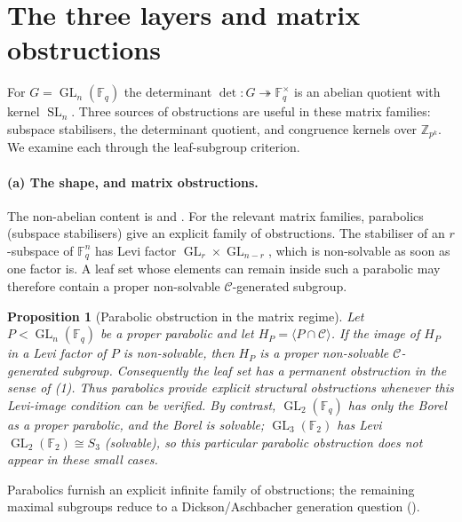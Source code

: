 \documentclass[11pt]{amsart}
\newtheorem{proposition}[proposition]{Proposition}
\theoremstyle{definition}
\theoremstyle{remark}
\theoremstyle{plain}
\theoremstyle{plain}
\numberwithin{equation}{section}
\DeclareMathOperator{\GL}{GL}
\DeclareMathOperator{\SL}{SL}
\newcommand{\F}{\mathbb{F}}
\newcommand{\Z}{\mathbb{Z}}
\begin{document}
\newpage
\section{The three layers and matrix obstructions}
\label{sec:layers}

For $G=\GL_n(\F_q)$ the determinant $\det:G\twoheadrightarrow\F_q^\times$
is an abelian quotient with kernel $\SL_n$. Three sources of obstructions
are useful in these matrix families: subspace stabilisers, the determinant
quotient, and congruence kernels over $\Z_{p^k}$. We examine each through
the leaf-subgroup criterion.

\paragraph{(a) The shape, and matrix obstructions.}
The non-abelian content is  and . For the relevant
matrix families, parabolics (subspace stabilisers) give an explicit family of
obstructions. The stabiliser of an $r$-subspace of $\F_q^n$ has Levi
factor $\GL_r\times\GL_{n-r}$, which is non-solvable as soon as one factor is. A leaf set whose
elements can remain inside such a parabolic may therefore contain a proper non-solvable
$\mathcal C$-generated subgroup.

\begin{proposition}[Parabolic obstruction in the matrix regime]
\label{prop:parabolic}
Let $P<\GL_n(\F_q)$ be a proper parabolic and let
$H_P=\langle P\cap\mathcal C\rangle$. If the image of $H_P$ in a Levi factor of $P$ is
non-solvable, then $H_P$ is a proper non-solvable $\mathcal C$-generated subgroup. Consequently
the leaf set has a permanent obstruction in the sense of (1). Thus
parabolics provide explicit structural obstructions whenever this Levi-image condition can be
verified. By contrast, $\GL_2(\F_q)$ has only the Borel as a proper parabolic, and the Borel is
solvable; $\GL_3(\F_2)$ has Levi $\GL_2(\F_2)\cong S_3$ (solvable), so this particular parabolic
obstruction does not appear in these small cases.
\end{proposition}

Parabolics furnish an explicit infinite family of obstructions; the remaining maximal subgroups
reduce to a Dickson/Aschbacher generation question ().
\end{document}
